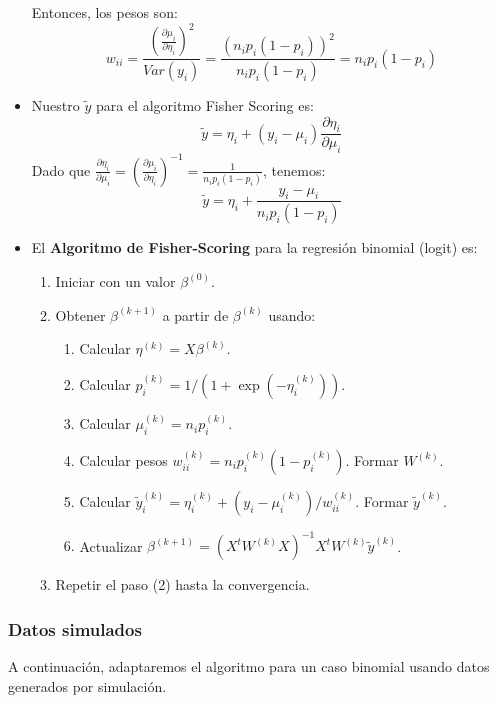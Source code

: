 \documentclass[
  letterpaper,
  DIV=11,
  numbers=noendperiod]{scrartcl}
\providecommand{\tightlist}{%
  \setlength{\itemsep}{0pt}\setlength{\parskip}{0pt}}\usepackage{longtable,booktabs,array}
\begin{document}
\begin{itemize}
  Entonces, los pesos son:
  \[w_{ii} = \frac{\left(\frac{\partial \mu_i}{\partial \eta_i}\right)^2}{Var(y_i)} = \frac{(n_i p_i (1-p_i))^2}{n_i p_i (1-p_i)} = n_i p_i (1-p_i)\]
\item
  Nuestro \(\widetilde{y}\) para el algoritmo Fisher Scoring es:
  \[\widetilde{y} = \eta_i + (y_i - \mu_i)\frac{\partial \eta_i}{\partial \mu_i}\]
  Dado que
  \(\frac{\partial \eta_i}{\partial \mu_i} = \left(\frac{\partial \mu_i}{\partial \eta_i}\right)^{-1} = \frac{1}{n_i p_i (1-p_i)}\),
  tenemos:
  \[\widetilde{y} = \eta_i + \frac{y_i - \mu_i}{n_i p_i (1-p_i)}\]
\item
  El \textbf{Algoritmo de Fisher-Scoring} para la regresión binomial
  (logit) es:

  \begin{enumerate}
  \def\labelenumi{\arabic{enumi}.}
  \tightlist
  \item
    Iniciar con un valor \(\beta^{(0)}\).
  \item
    Obtener \(\beta^{(k+1)}\) a partir de \(\beta^{(k)}\) usando:

    \begin{enumerate}
    \def\labelenumii{\alph{enumii}.}
    \tightlist
    \item
      Calcular \(\eta^{(k)} = X \beta^{(k)}\).
    \item
      Calcular \(p^{(k)}_i = 1 / (1 + \exp(-\eta^{(k)}_i))\).
    \item
      Calcular \(\mu^{(k)}_i = n_i p^{(k)}_i\).
    \item
      Calcular pesos \(w^{(k)}_{ii} = n_i p^{(k)}_i (1-p^{(k)}_i)\).
      Formar \(W^{(k)}\).
    \item
      Calcular
      \(\widetilde{y}^{(k)}_i = \eta^{(k)}_i + (y_i - \mu^{(k)}_i) / w^{(k)}_{ii}\).
      Formar \(\widetilde{y}^{(k)}\).
    \item
      Actualizar
      \(\beta^{(k+1)} = \left(X^tW^{(k)}X\right)^{-1}X^tW^{(k)}\widetilde{y}^{(k)}\).
    \end{enumerate}
  \item
    Repetir el paso (2) hasta la convergencia.
  \end{enumerate}
\end{itemize}

\subsubsection{Datos simulados}\label{datos-simulados}

A continuación, adaptaremos el algoritmo para un caso binomial usando
datos generados por simulación.
\end{document}
